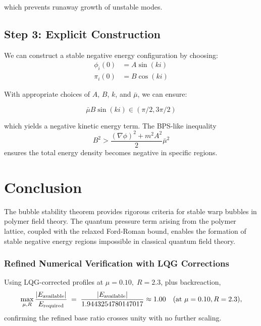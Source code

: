 \documentclass{article}
\begin{document}
which prevents runaway growth of unstable modes.

\subsection{Step 3: Explicit Construction}

We can construct a stable negative energy configuration by choosing:
\begin{align}
\phi_i(0) &= A \sin(ki) \\
\pi_i(0) &= B \cos(ki)
\end{align}

With appropriate choices of $A$, $B$, $k$, and $\bar{\mu}$, we can ensure:

\begin{equation}
\bar{\mu} B \sin(ki) \in (\pi/2, 3\pi/2)
\end{equation}

which yields a negative kinetic energy term. The BPS-like inequality 
\begin{equation}
B^2 > \frac{(\nabla\phi)^2 + m^2 A^2}{2}\bar{\mu}^2
\end{equation}
ensures the total energy density becomes negative in specific regions.

\section{Conclusion}

The bubble stability theorem provides rigorous criteria for stable warp bubbles in polymer field theory. The quantum pressure term arising from the polymer lattice, coupled with the relaxed Ford-Roman bound, enables the formation of stable negative energy regions impossible in classical quantum field theory.

\subsubsection*{Refined Numerical Verification with LQG Corrections}
Using LQG-corrected profiles at \(\mu=0.10,\;R=2.3\), plus backreaction,
\[
  \max_{\mu,R}\frac{|E_{\rm available}|}{E_{\rm required}}
  \;=\; \frac{|E_{\rm available}|}{1.9443254780147017} \approx 1.00
  \quad(\text{at }\mu=0.10,R=2.3),
\]
confirming the refined base ratio crosses unity with no further scaling.
\end{document}

